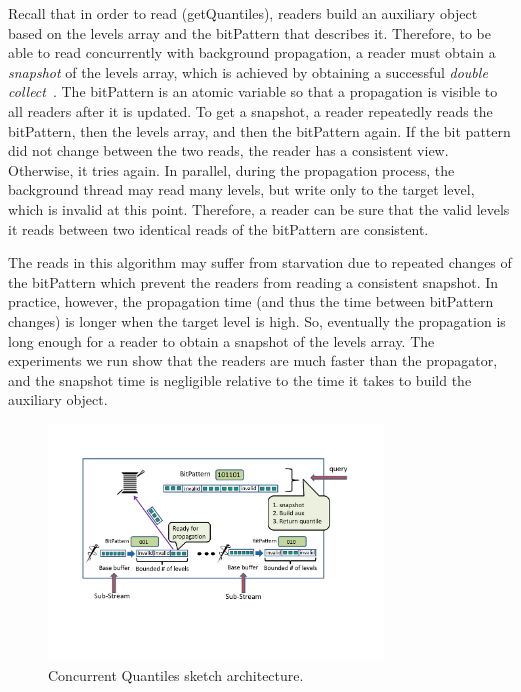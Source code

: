 Recall that in order to read (getQuantiles), readers build an
auxiliary object based on the levels array and the bitPattern
that describes it.
Therefore, to be able to read concurrently with
background propagation, a reader must obtain a \emph{snapshot} of the
levels array, which is achieved by obtaining 
 a successful  \emph{double collect}~\cite{snapshot}.
The bitPattern is an atomic variable so
that a propagation is visible to all readers after 
it is updated.
To get a snapshot, a reader repeatedly reads the bitPattern, then the levels array,
and then the bitPattern again.
If the bit pattern did not change between the two reads, the
reader has a consistent view.
Otherwise, it tries again.
In parallel, during the propagation process, the background
thread may read many levels, but write only to the target level,
which is invalid at this point.
Therefore, a reader can be sure that the valid levels it reads
between two identical reads of the bitPattern are consistent.

The reads in this algorithm may suffer from starvation due to repeated changes of the bitPattern which prevent the readers from reading a consistent snapshot.
In practice, however, the propagation time (and thus
the time between bitPattern changes) is longer when the target
level is high.
So, eventually the propagation is long enough for
a reader to obtain a snapshot of the levels array. 
The experiments we run show that the readers are 
much faster than the propagator, and the snapshot time is negligible relative to the time it takes to
build the auxiliary object.


\begin{figure}[tb]
    \centering
    \includegraphics[width=3.5in]{images/cocurrentQuntiles.pdf}
    \caption{Concurrent Quantiles sketch architecture.}
    \label{cocurrentQuntiles}
\end{figure}

